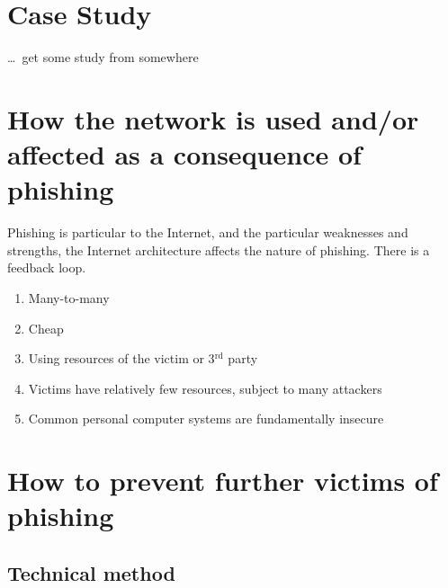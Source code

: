 \documentclass[10pt]{article}
\begin{document}
\section{Case Study}

\ldots\, get some study from somewhere

%
%

\section{How the network is used and/or affected as a consequence of phishing}

Phishing is particular to the Internet, and the particular weaknesses and strengths, the Internet architecture affects the nature of phishing.  There is a feedback loop.

\begin{enumerate}
\item Many-to-many
\item Cheap
\item Using resources of the victim or 3$^{\textrm{rd}}$ party
\item Victims have relatively few resources, subject to many attackers
\item Common personal computer systems are fundamentally insecure \cite{xxx}
\end{enumerate}

%
%

\section{How to prevent further victims of phishing}

%
%

\subsection{Technical method}
\end{document}
